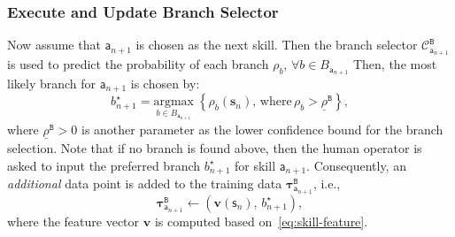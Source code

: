 \subsubsection{Execute and Update Branch Selector}\label{subsubsec:update-branch}

Now assume that $\mathsf{a}_{n+1}$ is chosen as the next skill. 
Then the branch selector $\mathcal{C}_{\mathsf{a}_{n+1}}^{\texttt{B}}$ is used to predict the probability of each branch $\rho_{b}$, $\forall b\in B_{\mathsf{a}_{n+1}}$
Then, the most likely branch for $\mathsf{a}_{n+1}$ is chosen by:
\begin{equation}\label{eq:next-branch}
b^\star_{n+1}=
\underset{b \in B_{\mathsf{a}_{n+1}}}{\mathrm{argmax}} \;\left\{\rho_{b}(\mathbf{s}_n),\, \text{where} \, \rho_{b} > \underline{\rho}^{\texttt{B}} \right\},
\end{equation}
where $\underline{\rho}^{\texttt{B}}>0$ is another parameter as the lower confidence bound
for the branch selection.
Note that if no branch is found above, then the human operator is asked to input the preferred branch $b^\star_{n+1}$ for skill $\mathsf{a}_{n+1}$.
Consequently, an \emph{additional} data point is added to the training data $\boldsymbol{\tau}_{\mathsf{a}_{n+1}}^{\texttt{B}}$, i.e., 
\begin{equation}\label{eq:human-input-2}
\boldsymbol{\tau}^{\texttt{B}}_{\mathsf{a}_{n+1}} \leftarrow \left( \mathbf{v}(\mathsf{s}_n),\,b^\star_{n+1} \right),
\end{equation}
where the feature vector $\mathbf{v}$ is computed based on~\eqref{eq:skill-feature}.


